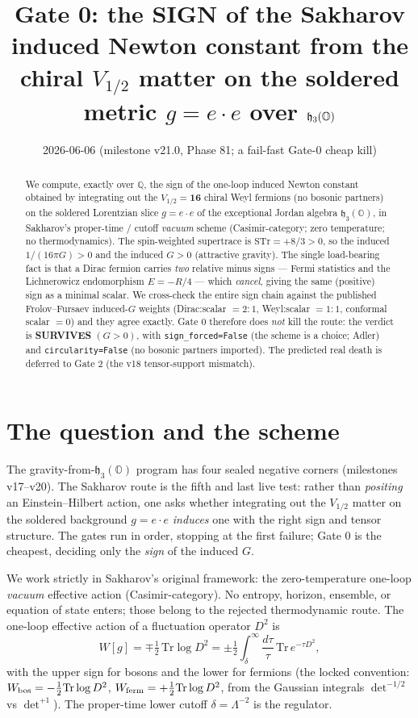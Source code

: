 \documentclass[11pt]{article}
\title{Gate 0: the SIGN of the Sakharov induced Newton constant from the chiral
$V_{1/2}$ matter on the soldered metric $g=e\!\cdot\!e$ over $\h_3(\Oo)$}
\date{2026-06-06 \quad (milestone v21.0, Phase 81; a fail-fast Gate-0 cheap kill)}
\newcommand{\Tr}{\mathrm{Tr}}
\newcommand{\STr}{\mathrm{STr}}
\newcommand{\h}{\mathfrak{h}}
\newcommand{\Oo}{\mathbb{O}}
\newcommand{\QQ}{\mathbb{Q}}
\begin{document}
\maketitle

\begin{abstract}
We compute, exactly over $\QQ$, the sign of the one-loop induced Newton constant
obtained by integrating out the $V_{1/2}=\mathbf{16}$ chiral Weyl fermions (no bosonic
partners) on the soldered Lorentzian slice $g=e\!\cdot\!e$ of the exceptional Jordan
algebra $\h_3(\Oo)$, in Sakharov's proper-time / cutoff \emph{vacuum} scheme
(Casimir-category; zero temperature; no thermodynamics). The spin-weighted supertrace
is $\STr=+8/3>0$, so the induced $1/(16\pi G)>0$ and the induced $G>0$ (attractive
gravity). The single load-bearing fact is that a Dirac fermion carries \emph{two}
relative minus signs --- Fermi statistics and the Lichnerowicz endomorphism $E=-R/4$
--- which \emph{cancel}, giving the same (positive) sign as a minimal scalar. We
cross-check the entire sign chain against the published Frolov--Fursaev induced-$G$
weights (Dirac:scalar $=2:1$, Weyl:scalar $=1:1$, conformal scalar $=0$) and they agree
exactly. Gate 0 therefore does \emph{not} kill the route: the verdict is
\textbf{SURVIVES} $(G>0)$, with \texttt{sign\_forced=False} (the scheme is a choice;
Adler) and \texttt{circularity=False} (no bosonic partners imported). The predicted
real death is deferred to Gate 2 (the v18 tensor-support mismatch).
\end{abstract}

\section{The question and the scheme}\label{sec:setup}

The gravity-from-$\h_3(\Oo)$ program has four sealed negative corners (milestones
v17--v20). The Sakharov route is the fifth and last live test: rather than
\emph{positing} an Einstein--Hilbert action, one asks whether integrating out the
$V_{1/2}$ matter on the soldered background $g=e\!\cdot\!e$ \emph{induces} one with the
right sign and tensor structure. The gates run in order, stopping at the first failure;
Gate 0 is the cheapest, deciding only the \emph{sign} of the induced $G$.

We work strictly in Sakharov's original framework: the zero-temperature one-loop
\emph{vacuum} effective action (Casimir-category). No entropy, horizon, ensemble, or
equation of state enters; those belong to the rejected thermodynamic route. The
one-loop effective action of a fluctuation operator $D^2$ is
\begin{equation}\label{eq:Weff}
W[g]=\mp\tfrac12\,\Tr\log D^2
   =\pm\tfrac12\int_{\delta}^{\infty}\frac{d\tau}{\tau}\,\Tr\, e^{-\tau D^2},
\end{equation}
with the upper sign for bosons and the lower for fermions (the locked convention:
$W_{\rm bos}=-\tfrac12\Tr\log D^2$, $W_{\rm ferm}=+\tfrac12\Tr\log D^2$, from the
Gaussian integrals $\det^{-1/2}$ vs $\det^{+1}$). The proper-time lower cutoff
$\delta=\Lambda^{-2}$ is the regulator.
\end{document}

